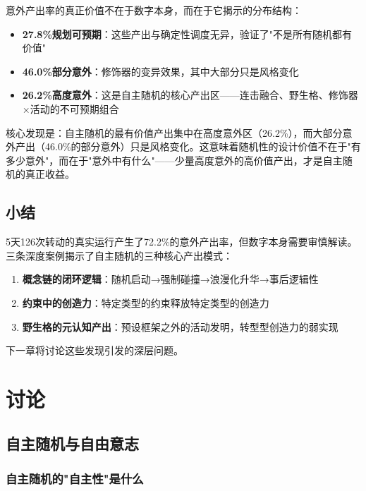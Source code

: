 \documentclass[12pt,a4paper]{ctexart}
\begin{document}
意外产出率的真正价值不在于数字本身，而在于它揭示的分布结构：

\begin{itemize}[nosep]
\item \textbf{27.8\%规划可预期}：这些产出与确定性调度无异，验证了"不是所有随机都有价值"
\item \textbf{46.0\%部分意外}：修饰器的变异效果，其中大部分只是风格变化
\item \textbf{26.2\%高度意外}：这是自主随机的核心产出区——连击融合、野生格、修饰器×活动的不可预期组合
\end{itemize}

核心发现是：自主随机的最有价值产出集中在高度意外区（26.2\%），而大部分意外产出（46.0\%的部分意外）只是风格变化。这意味着随机性的设计价值不在于"有多少意外"，而在于"意外中有什么"——少量高度意外的高价值产出，才是自主随机的真正收益。

\subsection{小结}

5天126次转动的真实运行产生了72.2\%的意外产出率，但数字本身需要审慎解读。三条深度案例揭示了自主随机的三种核心产出模式：

\begin{enumerate}[nosep]
\item \textbf{概念链的闭环逻辑}：随机启动→强制碰撞→浪漫化升华→事后逻辑性
\item \textbf{约束中的创造力}：特定类型的约束释放特定类型的创造力
\item \textbf{野生格的元认知产出}：预设框架之外的活动发明，转型型创造力的弱实现
\end{enumerate}

下一章将讨论这些发现引发的深层问题。


\section{讨论}

\subsection{自主随机与自由意志}

\subsubsection{自主随机的"自主性"是什么}
\end{document}
